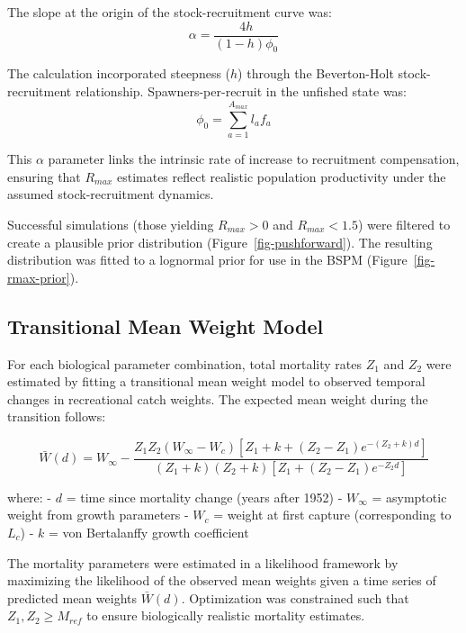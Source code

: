 \documentclass[
  11pt,
]{SCreport}
\begin{document}
The slope at the origin of the stock-recruitment curve was:
\[\alpha = \frac{4h}{(1-h)\phi_0}\]

The calculation incorporated steepness (\(h\)) through the Beverton-Holt
stock-recruitment relationship. Spawners-per-recruit in the unfished
state was: \[\phi_0 = \sum_{a=1}^{A_{max}} l_a f_a\]

This \(\alpha\) parameter links the intrinsic rate of increase to
recruitment compensation, ensuring that \(R_{max}\) estimates reflect
realistic population productivity under the assumed stock-recruitment
dynamics.

Successful simulations (those yielding \(R_{max} > 0\) and
\(R_{max} < 1.5\)) were filtered to create a plausible prior
distribution (Figure~\ref{fig-pushforward}). The resulting distribution
was fitted to a lognormal prior for use in the BSPM
(Figure~\ref{fig-rmax-prior}).

\subsection{Transitional Mean Weight
Model}\label{sec-transitional-weight-model}

For each biological parameter combination, total mortality rates \(Z_1\)
and \(Z_2\) were estimated by fitting a transitional mean weight model
to observed temporal changes in recreational catch weights. The expected
mean weight during the transition follows:

\[\bar{W}(d) = W_{\infty} - \frac{Z_1 Z_2 (W_{\infty} - W_c) [Z_1 + k + (Z_2 - Z_1)e^{-(Z_2+k)d}]}{(Z_1 + k)(Z_2 + k)[Z_1 + (Z_2 - Z_1)e^{-Z_2 d}]}\]

where: - \(d\) = time since mortality change (years after 1952) -
\(W_{\infty}\) = asymptotic weight from growth parameters - \(W_c\) =
weight at first capture (corresponding to \(L_c\)) - \(k\) = von
Bertalanffy growth coefficient

The mortality parameters were estimated in a likelihood framework by
maximizing the likelihood of the observed mean weights given a time
series of predicted mean weights \(\bar{W}(d)\). Optimization was
constrained such that \(Z_1, Z_2 \geq M_{ref}\) to ensure biologically
realistic mortality estimates.
\end{document}
